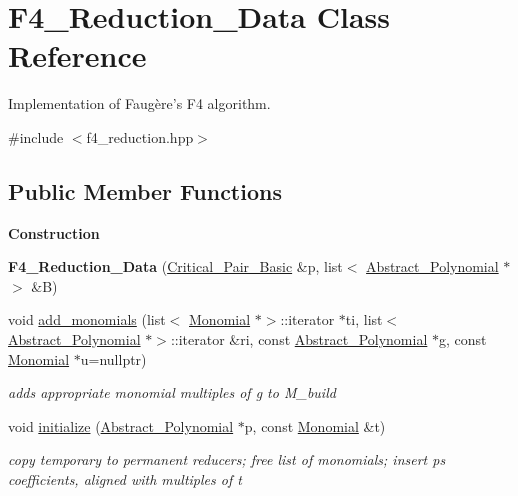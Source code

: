 \hypertarget{class_f4___reduction___data}{}\section{F4\+\_\+\+Reduction\+\_\+\+Data Class Reference}
\label{class_f4___reduction___data}


Implementation of Faug\`{e}re's F4 algorithm.  




{\ttfamily \#include $<$f4\+\_\+reduction.\+hpp$>$}

\subsection*{Public Member Functions}
\begin{Indent}\textbf{ Construction}\par
\begin{DoxyCompactItemize}
\item 
\mbox{\label{class_f4___reduction___data_a794a59595b63b9ffaf76e14f1bf84b90}} 
{\bfseries F4\+\_\+\+Reduction\+\_\+\+Data} (\hyperlink{class_critical___pair___basic}{Critical\+\_\+\+Pair\+\_\+\+Basic} \&p, list$<$ \hyperlink{class_abstract___polynomial}{Abstract\+\_\+\+Polynomial} $\ast$$>$ \&B)
\item 
void \hyperlink{class_f4___reduction___data_a6aafe4ae97a998659cee55a9ea97cf85}{add\+\_\+monomials} (list$<$ \hyperlink{class_monomial}{Monomial} $\ast$$>$\+::iterator $\ast$ti, list$<$ \hyperlink{class_abstract___polynomial}{Abstract\+\_\+\+Polynomial} $\ast$$>$\+::iterator \&ri, const \hyperlink{class_abstract___polynomial}{Abstract\+\_\+\+Polynomial} $\ast$g, const \hyperlink{class_monomial}{Monomial} $\ast$u=nullptr)
\begin{DoxyCompactList}\small\item\em adds appropriate monomial multiples of {\ttfamily g} to {\ttfamily M\+\_\+build} \end{DoxyCompactList}\item 
\mbox{\label{class_f4___reduction___data_a7140e5b7db68b0e5a016fc569ed9d046}} 
void \hyperlink{class_f4___reduction___data_a7140e5b7db68b0e5a016fc569ed9d046}{initialize} (\hyperlink{class_abstract___polynomial}{Abstract\+\_\+\+Polynomial} $\ast$p, const \hyperlink{class_monomial}{Monomial} \&t)
\begin{DoxyCompactList}\small\item\em copy temporary to permanent reducers; free list of monomials; insert {\ttfamily p\textquotesingle{}s} coefficients, aligned with multiples of {\ttfamily t} \end{DoxyCompactList}\end{DoxyCompactItemize}
\end{Indent}
